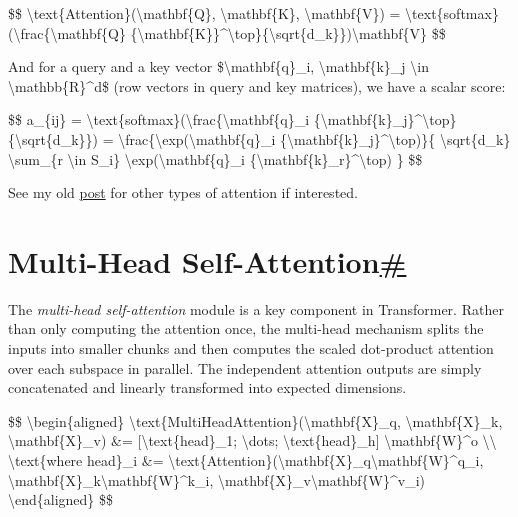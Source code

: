 \$\$ \textbackslash text\{Attention\}(\textbackslash mathbf\{Q\}, \textbackslash mathbf\{K\}, \textbackslash mathbf\{V\}) = \textbackslash text\{softmax\}(\textbackslash frac\{\textbackslash mathbf\{Q\} \{\textbackslash mathbf\{K\}\}\^{}\textbackslash top\}\{\textbackslash sqrt\{d\_k\}\})\textbackslash mathbf\{V\} \$\$

And for a query and a key vector \$\textbackslash mathbf\{q\}\_i, \textbackslash mathbf\{k\}\_j \textbackslash in \textbackslash mathbb\{R\}\^{}d\$ (row vectors in query and key matrices), we have a scalar score:

\$\$ a\_\{ij\} = \textbackslash text\{softmax\}(\textbackslash frac\{\textbackslash mathbf\{q\}\_i \{\textbackslash mathbf\{k\}\_j\}\^{}\textbackslash top\}\{\textbackslash sqrt\{d\_k\}\}) = \textbackslash frac\{\textbackslash exp(\textbackslash mathbf\{q\}\_i \{\textbackslash mathbf\{k\}\_j\}\^{}\textbackslash top)\}\{ \textbackslash sqrt\{d\_k\} \textbackslash sum\_\{r \textbackslash in S\_i\} \textbackslash exp(\textbackslash mathbf\{q\}\_i \{\textbackslash mathbf\{k\}\_r\}\^{}\textbackslash top) \} \$\$

See my old \href{https://lilianweng.github.io/posts/2018-06-24-attention/\#a-family-of-attention-mechanisms}{post} for other types of attention if interested.

\section{\texorpdfstring{Multi-Head Self-Attention\hyperref[multi-head-self-attention]{\#}}{Multi-Head Self-Attention\#}}\label{multi-head-self-attention}

The \emph{multi-head self-attention} module is a key component in Transformer. Rather than only computing the attention once, the multi-head mechanism splits the inputs into smaller chunks and then computes the scaled dot-product attention over each subspace in parallel. The independent attention outputs are simply concatenated and linearly transformed into expected dimensions.

\$\$ \textbackslash begin\{aligned\} \textbackslash text\{MultiHeadAttention\}(\textbackslash mathbf\{X\}\_q, \textbackslash mathbf\{X\}\_k, \textbackslash mathbf\{X\}\_v) \&= {[}\textbackslash text\{head\}\_1; \textbackslash dots; \textbackslash text\{head\}\_h{]} \textbackslash mathbf\{W\}\^{}o \textbackslash\textbackslash{} \textbackslash text\{where head\}\_i \&= \textbackslash text\{Attention\}(\textbackslash mathbf\{X\}\_q\textbackslash mathbf\{W\}\^{}q\_i, \textbackslash mathbf\{X\}\_k\textbackslash mathbf\{W\}\^{}k\_i, \textbackslash mathbf\{X\}\_v\textbackslash mathbf\{W\}\^{}v\_i) \textbackslash end\{aligned\} \$\$

